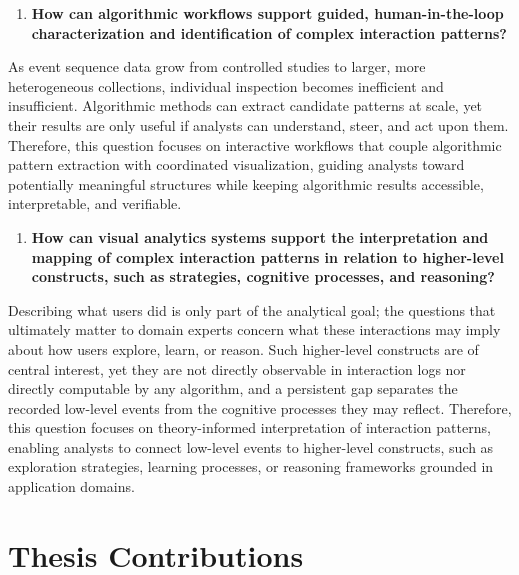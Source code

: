 \begin{enumerate}
    \renewcommand{\labelenumi}{RQ\arabic{enumi}.}
    \setcounter{enumi}{2}
    \item 
    \textbf{How can algorithmic workflows support guided, human-in-the-loop characterization and identification of complex interaction patterns?}
\end{enumerate}
As event sequence data grow from controlled studies to larger, more heterogeneous collections, individual inspection becomes inefficient and insufficient.
Algorithmic methods can extract candidate patterns at scale, yet their results are only useful if analysts can understand, steer, and act upon them.
Therefore, this question focuses on interactive workflows that couple algorithmic pattern extraction with coordinated visualization, guiding analysts toward potentially meaningful structures while keeping algorithmic results accessible, interpretable, and verifiable.

\begin{enumerate}
    \renewcommand{\labelenumi}{RQ\arabic{enumi}.}
    \setcounter{enumi}{3}
    \item
    \textbf{How can visual analytics systems support the interpretation and mapping of complex interaction patterns in relation to higher-level constructs, such as strategies, cognitive processes, and reasoning?}
\end{enumerate}
Describing what users did is only part of the analytical goal; the questions that ultimately matter to domain experts concern what these interactions may imply about how users explore, learn, or reason.
Such higher-level constructs are of central interest, yet they are not directly observable in interaction logs nor directly computable by any algorithm, and a persistent gap separates the recorded low-level events from the cognitive processes they may reflect.
Therefore, this question focuses on theory-informed interpretation of interaction patterns, enabling analysts to connect low-level events to higher-level constructs, such as exploration strategies, learning processes, or reasoning frameworks grounded in application domains.





\section{Thesis Contributions}

